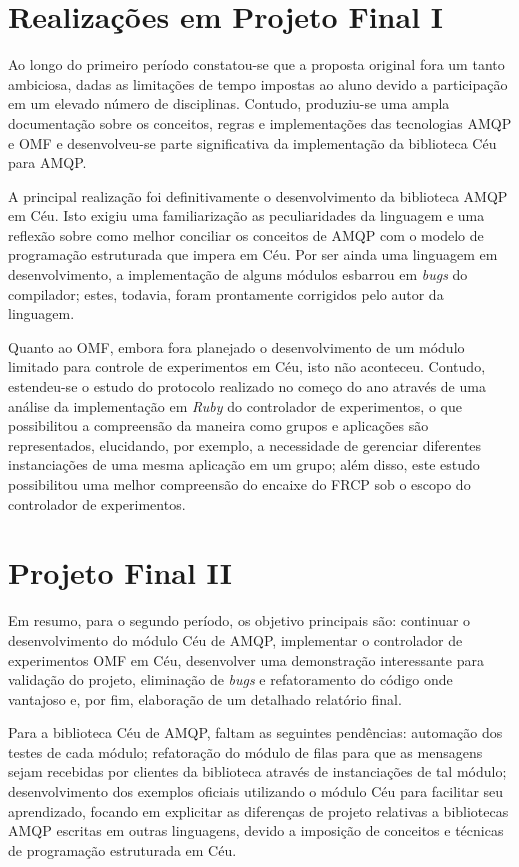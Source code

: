 \section{Realizações em Projeto Final I}

Ao longo do primeiro período constatou-se que a proposta original fora um tanto ambiciosa, dadas as limitações de tempo impostas ao aluno devido a participação em um elevado número de disciplinas. Contudo, produziu-se uma ampla documentação sobre os conceitos, regras e implementações das tecnologias AMQP e OMF e desenvolveu-se parte significativa da implementação da biblioteca Céu para AMQP.

A principal realização foi definitivamente o desenvolvimento da biblioteca AMQP em Céu. Isto exigiu uma familiarização as peculiaridades da linguagem e uma reflexão sobre como melhor conciliar os conceitos de AMQP com o modelo de programação estruturada que impera em Céu. Por ser ainda uma linguagem em desenvolvimento, a implementação de alguns módulos esbarrou em \textit{bugs} do compilador; estes, todavia, foram prontamente corrigidos pelo autor da linguagem.

Quanto ao OMF, embora fora planejado o desenvolvimento de um módulo limitado para controle de experimentos em Céu, isto não aconteceu. Contudo, estendeu-se o estudo do protocolo realizado no começo do ano através de uma análise da implementação em \textit{Ruby} do controlador de experimentos, o que possibilitou a compreensão da maneira como grupos e aplicações são representados, elucidando, por exemplo, a necessidade de gerenciar diferentes instanciações de uma mesma aplicação em um grupo; além disso, este estudo possibilitou uma melhor compreensão do encaixe do FRCP sob o escopo do controlador de experimentos. 

\section{Projeto Final II}

Em resumo, para o segundo período, os objetivo principais s\~ao: continuar o desenvolvimento do módulo Céu de AMQP, implementar o controlador de experimentos OMF em C\'eu, desenvolver uma demonstra\c{c}\~ao interessante para valida\c{c}\~ao do projeto, elimina\c{c}\~ao de \textit{bugs} e refatoramento do c\'odigo onde vantajoso e, por fim, elabora\c{c}\~ao de um detalhado relat\'orio final.

Para a biblioteca Céu de AMQP, faltam as seguintes pendências: automação dos testes de cada módulo; refatoração do módulo de filas para que as mensagens sejam recebidas por clientes da biblioteca através de instanciações de tal módulo; desenvolvimento dos exemplos oficiais utilizando o módulo Céu para facilitar seu aprendizado, focando em explicitar as diferenças de projeto relativas a bibliotecas AMQP escritas em outras linguagens, devido a imposição de conceitos e técnicas de programação estruturada em Céu.

